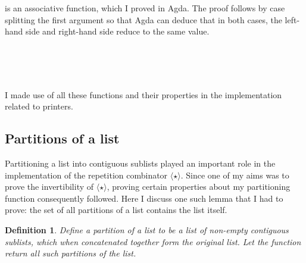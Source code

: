\documentclass[12pt,a4paper,twoside,openright]{report}
\newcommand{\F}{\AgdaFunction}
\newtheorem{definition}{Definition}[section]
\begin{document}
{\F{mplus} is an associative function, which I proved in Agda. The proof follows by case splitting the first argument so that Agda can deduce that in both cases, the left-hand side and right-hand side reduce to the same value.

\begin{code}
\> \AgdaSymbol{:} \>[13]\AgdaSymbol{\{} \AgdaSymbol{:} \AgdaSymbol{\}}  \AgdaSymbol{(}   \AgdaSymbol{:}  \AgdaSymbol{)}  \<%
\\
\>[13]   \AgdaSymbol{(}  \AgdaSymbol{)}   \AgdaSymbol{(}  \AgdaSymbol{)} \<
\\
\> \AgdaSymbol{(} \AgdaSymbol{)}   \AgdaSymbol{=} \<%
\\
\>    \AgdaSymbol{=} \<%
\end{code}

I made use of all these functions and their properties in the implementation related to printers.

\subsection{Partitions of a list} \label{parts}

Partitioning a list into contiguous sublists played an important role in the implementation of the repetition combinator $\langle\star\rangle$. Since one of my aims was to prove the invertibility of $\langle\star\rangle$, proving certain properties about my partitioning function consequently followed. Here I discuss one such lemma that I had to prove: 
the set of all partitions of a list contains the list itself.

\begin{definition}
Define a partition of a list to be a list of non-empty contiguous sublists, which when concatenated together form the original list. Let the function \F{parts} return all such partitions of the list.
\end{definition}

}
\end{document}
